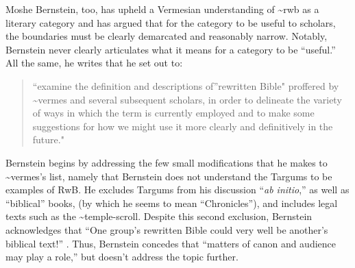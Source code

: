 Moshe Bernstein, too, has upheld a Vermesian understanding of
\textasciitilde{}rwb as a literary category and has argued that for the
category to be useful to scholars, the boundaries must be clearly
demarcated and reasonably narrow.\autocite{bernstein_textus2005}
Notably, Bernstein never clearly articulates what it means for a
category to be ``useful.'' All the same, he writes that he set out to:

\begin{quote}
``examine the definition and descriptions of''rewritten Bible" proffered
by \textasciitilde{}vermes and several subsequent scholars, in order to
delineate the variety of ways in which the term is currently employed
and to make some suggestions for how we might use it more clearly and
definitively in the future." \autocite[171--172]{bernstein_textus2005}
\end{quote}

Bernstein begins by addressing the few small modifications that he makes
to \textasciitilde{}vermes's list, namely that Bernstein does not
understand the Targums to be examples of RwB. He excludes Targums from
his discussion ``\emph{ab initio},'' as well as ``biblical'' books, (by
which he seems to mean ``Chronicles''), and includes legal texts such as
the \textasciitilde{}temple-scroll. Despite this second exclusion,
Bernstein acknowledges that ``One group's rewritten Bible could very
well be another's biblical text!'' \autocite[175. This seems
particularly odd, since, and Ethiopian Christian may protest that
\textasciitilde{}jub should be excluded as well.]{bernstein_textus2005}.
Thus, Bernstein concedes that ``matters of canon and audience may play a
role,'' but doesn't address the topic further.

